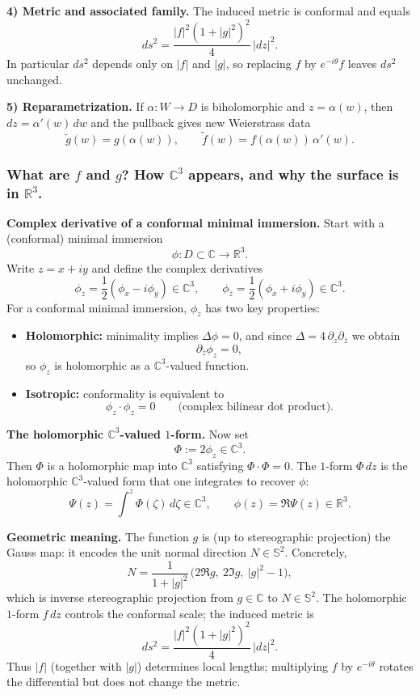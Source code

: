 \documentclass[12pt,a4paper]{article}
\theoremstyle{plain}
\theoremstyle{definition}      %
\begin{document}
\smallskip
\textbf{4) Metric and associated family.}
The induced metric is conformal and equals
\[
ds^2=\frac{|f|^2(1+|g|^2)^2}{4}\,|dz|^2.
\]
In particular $ds^2$ depends only on $|f|$ and $|g|$, so replacing $f$ by $e^{-i\theta}f$ leaves $ds^2$ unchanged.

\smallskip
\textbf{5) Reparametrization.}
If $\alpha:W\to D$ is biholomorphic and $z=\alpha(w)$, then $dz=\alpha'(w)\,dw$ and the pullback gives
new Weierstrass data
\[
\tilde g(w)=g(\alpha(w)),\qquad \tilde f(w)=f(\alpha(w))\,\alpha'(w).
\]

\medskip

\subsubsection*{What are $f$ and $g$? How $\mathbb C^3$ appears, and why the surface is in $\mathbb R^3$.}

\smallskip
\textbf{Complex derivative of a conformal minimal immersion.}
Start with a (conformal) minimal immersion
\[
\phi : D \subset \mathbb{C} \longrightarrow \mathbb{R}^3.
\]
Write $z=x+iy$ and define the complex derivatives
\[
\phi_z=\frac12(\phi_x-i\phi_y)\in\mathbb C^3,
\qquad
\phi_{\bar z}=\frac12(\phi_x+i\phi_y)\in\mathbb C^3.
\]
For a conformal minimal immersion, $\phi_z$ has two key properties:
\begin{itemize}
	\item \textbf{Holomorphic:} minimality implies $\Delta\phi=0$, and since $\Delta=4\,\partial_z\partial_{\bar z}$ we obtain
	\[
	\partial_{\bar z}\phi_z=0,
	\]
	so $\phi_z$ is holomorphic as a $\mathbb C^3$-valued function.
	\item \textbf{Isotropic:} conformality is equivalent to
	\[
	\phi_z\cdot \phi_z = 0
	\qquad\text{(complex bilinear dot product).}
	\]
\end{itemize}

\smallskip
\textbf{The holomorphic $\mathbb C^3$-valued $1$-form.}
Now set
\[
\Phi := 2\phi_z \in \mathbb C^3.
\]
Then $\Phi$ is a holomorphic map into $\mathbb C^3$ satisfying $\Phi\cdot \Phi=0$.
The $1$-form $\Phi\,dz$ is the holomorphic $\mathbb C^3$-valued form that one integrates to recover $\phi$:
\[
\Psi(z)=\int^z \Phi(\zeta)\,d\zeta \in \mathbb C^3,
\qquad
\phi(z)=\Re \Psi(z)\in \mathbb R^3.
\]

\smallskip
\textbf{Geometric meaning.}
The function $g$ is (up to stereographic projection) the Gauss map: it encodes the unit normal direction
$N\in\mathbb S^2$. Concretely,
\[
N
=
\frac{1}{1+|g|^2}\,\bigl(2\Re g,\ 2\Im g,\ |g|^2-1\bigr),
\]
which is inverse stereographic projection from $g\in\mathbb C$ to $N\in\mathbb S^2$.
The holomorphic $1$-form $f\,dz$ controls the conformal scale; the induced metric is
\[
ds^2
=
\frac{|f|^2(1+|g|^2)^2}{4}\,|dz|^2.
\]
Thus $|f|$ (together with $|g|$) determines local lengths; multiplying $f$ by $e^{-i\theta}$ rotates the differential but
does not change the metric.
\end{document}
